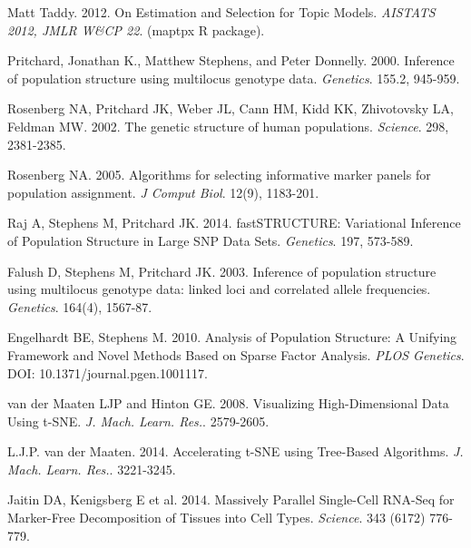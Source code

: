 \documentclass[10pt,letterpaper]{article}
\begin{document}
\begin{thebibliography}{9}
Matt Taddy. 2012.
On Estimation and Selection for Topic Models.
\textit{AISTATS 2012, JMLR W\&CP 22}.
(maptpx R package).

Pritchard, Jonathan K., Matthew Stephens, and Peter Donnelly. 2000.
Inference of population structure using multilocus genotype data.
\textit{Genetics}. 155.2,  945-959.

Rosenberg NA, Pritchard JK,  Weber JL, Cann HM,  Kidd KK,  Zhivotovsky LA,  Feldman MW. 2002.
The genetic structure of human populations.
\textit{Science}. 298,  2381-2385.

Rosenberg NA. 2005.
Algorithms for selecting informative marker panels for population assignment.
\textit{J Comput Biol}. 12(9), 1183-201.

Raj A,  Stephens M,  Pritchard JK.  2014.
fastSTRUCTURE: Variational Inference of Population Structure in Large SNP Data Sets.
\textit{Genetics}. 197,  573-589.

Falush D,  Stephens M,  Pritchard JK. 2003.
Inference of population structure using multilocus genotype data: linked loci and correlated allele frequencies.
\textit{Genetics}. 164(4), 1567-87.

Engelhardt BE,  Stephens M. 2010.
Analysis of Population Structure: A Unifying Framework and Novel Methods Based on Sparse Factor Analysis.
\textit{PLOS Genetics}. DOI: 10.1371/journal.pgen.1001117.

van der Maaten LJP and  Hinton GE. 2008.
Visualizing High-Dimensional Data Using t-SNE.
\textit{J. Mach. Learn. Res.}.  2579-2605.

L.J.P. van der Maaten. 2014.
Accelerating t-SNE using Tree-Based Algorithms.
\textit{J. Mach. Learn. Res.}.  3221-3245.



Jaitin DA,  Kenigsberg E et al. 2014.
Massively Parallel Single-Cell RNA-Seq for Marker-Free Decomposition of Tissues into Cell Types.
\textit{Science}. 343 (6172) 776-779.


\end{thebibliography}
\end{document}
